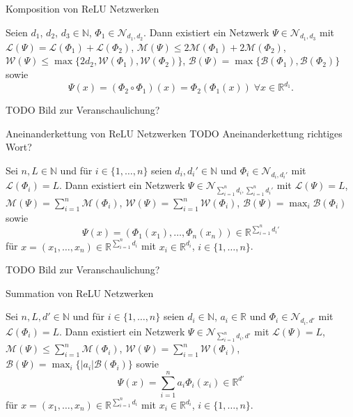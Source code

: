 \documentclass[10pt,aspectratio=169]{beamer}
\newcommand{\N}{\mathbb{N}} %
\newcommand{\R}{\mathbb{R}} %
\newcommand{\set}[1]{\{#1\}}
\begin{document}
\begin{frame}{Komposition von ReLU Netzwerken}
    \begin{lemma}
        Seien \(d_1\), \(d_2\), \(d_3 \in \N\), \(\Phi_1 \in \mathcal{N}_{d_1, d_2}\). Dann existiert ein 
        Netzwerk \(\Psi \in \mathcal{N}_{d_1, d_3}\) mit \(\mathcal{L}(\Psi) = \mathcal{L}(\Phi_1) + \mathcal{L}(\Phi_2)\), 
        \(\mathcal{M}(\Psi) \leq 2 \mathcal{M}(\Phi_1) + 2\mathcal{M}(\Phi_2)\), \(\mathcal{W}(\Psi) \leq 
        \max\set{2d_2, \mathcal{W}(\Phi_1), \mathcal{W}(\Phi_2)}\), \(\mathcal{B}(\Psi) = \max\set{\mathcal{B}(\Phi_1), \mathcal{B}(\Phi_2)}\) 
        sowie
        \[ \Psi(x) = (\Phi_2 \circ \Phi_1)(x) = \Phi_2(\Phi_1(x)) \;\forall x\in \R^{d_1}. \]
    \end{lemma}
    TODO Bild zur Veranschaulichung?
\end{frame}

\begin{frame}{Aneinanderkettung von ReLU Netzwerken}
    TODO Aneinanderkettung richtiges Wort?
    \begin{lemma}
        Sei \(n, L \in\N\) und für \(i\in \set{1,\ldots, n}\) seien \(d_i, d_i' \in \N\) und \(\Phi_i \in \mathcal{N}_{d_i, d_i'}\) 
        mit \(\mathcal{L}(\Phi_i) = L\). Dann existiert ein Netzwerk \(\Psi \in \mathcal{N}_{\sum_{i=1}^n d_i, \sum_{i=1}^n d_i'}\) 
        mit \(\mathcal{L}(\Psi) = L\), \(\mathcal{M}(\Psi) = \sum_{i=1}^n \mathcal{M}(\Phi_i)\), 
        \(\mathcal{W}(\Psi) = \sum_{i=1}^n \mathcal{W}(\Phi_i)\), \(\mathcal{B}(\Psi) = \max_i \mathcal{B}(\Phi_i)\) sowie 
        \[ \Psi(x) = (\Phi_1(x_1), \ldots, \Phi_n(x_n)) \in \R^{\sum_{i=1}^n d_i'} \]
        für \(x = (x_1, \ldots, x_n) \in \R^{\sum_{i=1}^n d_i}\) mit \(x_i \in \R^{d_i}\), \(i\in \set{1,\ldots, n}\).
    \end{lemma}
    TODO Bild zur Veranschaulichung?
\end{frame}

\begin{frame}{Summation von ReLU Netzwerken}
    \begin{lemma}
        Sei \(n, L, d' \in\N\) und für \(i\in \set{1,\ldots, n}\) seien \(d_i \in \N\), \(a_i \in \R\) und \(\Phi_i \in \mathcal{N}_{d_i, d'}\) 
        mit \(\mathcal{L}(\Phi_i) = L\). Dann existiert ein Netzwerk \(\Psi \in \mathcal{N}_{\sum_{i=1}^n d_i, d'}\) 
        mit \(\mathcal{L}(\Psi) = L\), \(\mathcal{M}(\Psi) \leq \sum_{i=1}^n \mathcal{M}(\Phi_i)\), 
        \(\mathcal{W}(\Psi) = \sum_{i=1}^n \mathcal{W}(\Phi_i)\), \(\mathcal{B}(\Psi) = \max_i \set{|a_i| \mathcal{B}(\Phi_i)}\) sowie 
        \[ \Psi(x) = \sum_{i=1}^n a_i \Phi_i(x_i) \in \R^{d'} \]
        für \(x = (x_1, \ldots, x_n) \in \R^{\sum_{i=1}^n d_i}\) mit \(x_i \in \R^{d_i}\), \(i\in \set{1,\ldots, n}\).
    \end{lemma}
\end{frame}
\end{document}
